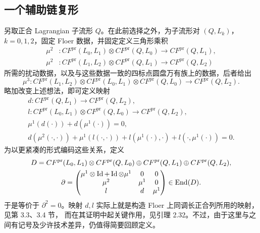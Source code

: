 \clearpage
\subsection{一个辅助链复形}\label{sec:17e}
另取正合 Lagrangian 子流形 $Q$。在此前选择之外，为子流形对 $(Q,L_k)$，$k=0,1,2$，固定 Floer 数据，并固定定义三角形乘积
\[
\begin{aligned}
\mu^2 &:CF^{\mathrm{pr}}(L_0,L_1)\otimes CF^{\mathrm{pr}}(Q,L_0)\longrightarrow CF^{\mathrm{pr}}(Q,L_1),\\
\mu^2 &:CF^{\mathrm{pr}}(L_1,L_2)\otimes CF^{\mathrm{pr}}(Q,L_1)\longrightarrow CF^{\mathrm{pr}}(Q,L_2)
\end{aligned}
\]
所需的扰动数据，以及与这些数据一致的四标点圆盘万有族上的数据，后者给出
\[
\mu^3:CF^{\mathrm{pr}}(L_1,L_2)\otimes CF^{\mathrm{pr}}(L_0,L_1)\otimes CF^{\mathrm{pr}}(Q,L_0)
\longrightarrow CF^{\mathrm{pr}}(Q,L_2).
\]
略加改变上述想法，即可定义映射
\begin{equation}\label{eq:17.15}
\boxed{\begin{gathered}
d:CF^{\mathrm{pr}}(Q,L_1)\longrightarrow CF^{\mathrm{pr}}(Q,L_2),\\
l:CF^{\mathrm{pr}}(L_0,L_1)\otimes CF^{\mathrm{pr}}(Q,L_0)\longrightarrow CF^{\mathrm{pr}}(Q,L_2),\\
\mu^1(d(\cdot))+d(\mu^1(\cdot))=0,\\
d(\mu^2(\cdot,\cdot))+\mu^1(l(\cdot,\cdot))
+l(\mu^1(\cdot),\cdot)+l(\cdot,\mu^1(\cdot))=0.
\end{gathered}}
\end{equation}
为以更紧凑的形式编码这些关系，定义
\begin{equation}\label{eq:17.16}
\begin{gathered}
D=CF^{\mathrm{pr}}(L_0,L_1)\otimes CF^{\mathrm{pr}}(Q,L_0)
\oplus CF^{\mathrm{pr}}(Q,L_1)\oplus CF^{\mathrm{pr}}(Q,L_2),\\
\partial=\begin{pmatrix}
\mu^1\otimes\operatorname{Id}+\operatorname{Id}\otimes\mu^1&0&0\\
\mu^2&\mu^1&0\\ l&d&\mu^1
\end{pmatrix}\in\operatorname{End}(D).
\end{gathered}
\end{equation}
于是等价于 $\partial^2=0$。映射 $d,l$ 实际上就是构造 Floer 上同调长正合列所用的映射，见第 3.3、3.4 节，
而在其证明中起关键作用，见引理 2.32。不过，由于这里与之间有记号及少许技术差异，仍值得简要回顾定义。

